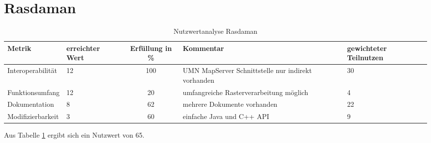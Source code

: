 

\section{Rasdaman}
\begin{table}[htp]
\centering
\small
\begin{tabular}{l|p{1.8cm}|c|p{3.1cm}|p{1.8cm}}
\textbf{Metrik} & \textbf{erreichter Wert} & \textbf{Erfüllung in \%} & \textbf{Kommentar} & \textbf{gewichteter Teilnutzen} \\ \hline
Interoperabilität & 12 & 100 & UMN MapServer Schnittstelle nur indirekt vorhanden & 30 \\ \hline
Funktionsumfang & 12 & 20 & umfangreiche Rasterverarbeitung möglich & 4 \\ \hline
Dokumentation & 8 & 62 & mehrere Dokumente vorhanden & 22 \\ \hline
Modifizierbarkeit & 3 & 60 & einfache Java und C++ API & 9 \\
\end{tabular}
\caption{Nutzwertanalyse Rasdaman}
\label{table:nutzwertanalyse-rasdaman}
\end{table}
Aus Tabelle \ref{table:nutzwertanalyse-rasdaman} ergibt sich ein Nutzwert von 65.



